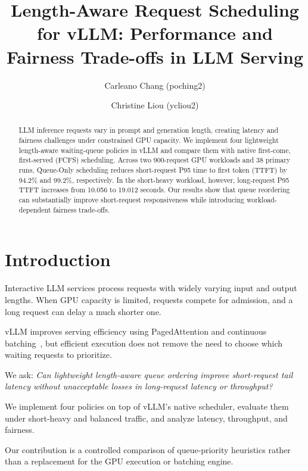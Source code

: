 \documentclass[sigplan,nonacm]{acmart}
\title{
Length-Aware Request Scheduling for vLLM:
Performance and Fairness Trade-offs in LLM Serving
}
\author{Carleano Chang (poching2)}
\author{Christine Liou (ycliou2)}
\begin{document}
\begin{abstract}
LLM inference requests vary in prompt and generation
length, creating latency and fairness challenges under
constrained GPU capacity. We implement four lightweight
length-aware waiting-queue policies in vLLM and compare
them with native first-come, first-served (FCFS)
scheduling. Across two 900-request GPU workloads and
38 primary runs, Queue-Only scheduling reduces
short-request P95 time to first token (TTFT) by
94.2\% and 99.2\%, respectively. In the short-heavy
workload, however, long-request P95 TTFT increases
from 10.056 to 19.012 seconds. Our results show that
queue reordering can substantially improve short-request
responsiveness while introducing workload-dependent
fairness trade-offs.
\end{abstract}


\maketitle

\pagestyle{plain}
\thispagestyle{plain}


\section{Introduction}

Interactive LLM services process requests with widely
varying input and output lengths. When GPU capacity is
limited, requests compete for admission, and a long
request can delay a much shorter one.

vLLM improves serving efficiency using PagedAttention
and continuous batching~\cite{kwon2023efficient},
but efficient execution does not remove the need
to choose which waiting requests to prioritize.

We ask:
\emph{Can lightweight length-aware queue ordering
improve short-request tail latency without unacceptable
losses in long-request latency or throughput?}

We implement four policies on top of vLLM's native
scheduler, evaluate them under short-heavy and
balanced traffic, and analyze latency, throughput,
and fairness.

Our contribution is a controlled comparison of
queue-priority heuristics rather than a replacement
for the GPU execution or batching engine.
\end{document}
